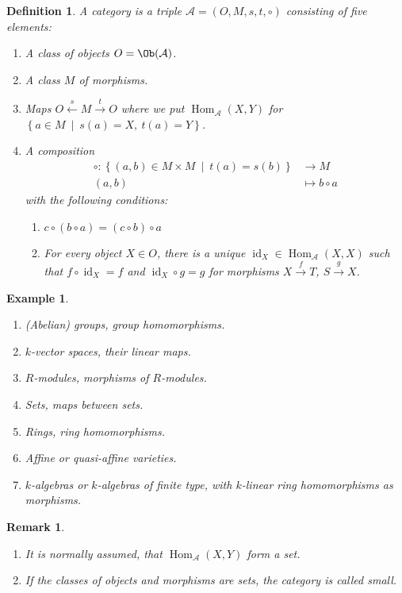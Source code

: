 \documentclass[DIV=14,parskip=full,pointednumbers]{scrartcl}
\newenvironment{alphanumerate}{\begin{enumerate}[label={$(\alph*)$},ref=\curthm]}{\end{enumerate}}
\theoremstyle{cthm}
\theoremstyle{cvarthm}
\theoremstyle{cdef}
\newtheorem*{defi*}{Definition}
\newtheorem{example*}{Example}
\newtheorem*{rem*}{Remark}
\newcommand{\Aa}{\mathcal{A}}
\newcommand{\Hom}{\operatorname{Hom}}
\newcommand{\id}{\operatorname{id}}
\newcommand{\longto}{\longrightarrow}
\newcommand{\longot}{\longleftarrow}
\newcommand{\morphism}[1][]{\overset{#1}{\longto}}
\newcommand{\st}{\ \middle|\ }
\begin{document}
	\begin{defi*}
	 A \emph{category} is a triple $\Aa = (O,M,s,t,\circ)$ consisting of five elements:
	 \begin{enumerate}
	  \item A class of \emph{objects} $O=\Ob(\Aa)$.
	  \item A class $M$ of \emph{morphisms}.
	  \item Maps $O\overset{s}{\longot} M \morphism[t] O$ where we put $\Hom_\Aa(X,Y)$ for $\left\{a\in M\st s(a) = X, \ t(a) = Y\right\}$.
	  \item A \emph{composition}
	  \begin{align*}
	   \circ: \left\{(a,b)\in M\times M \st t(a) = s(b)\right\} &\longto M\\
	   (a,b) &\longmapsto b\circ a         
	        \end{align*}
	        with the following conditions:
	        \begin{alphanumerate}
	        	\item $c\circ(b\circ a) = (c\circ b) \circ a$
	        	\item For every object $X\in O$, there is a unique $\id_X\in \Hom_\Aa(X,X)$ such that $f\circ \id_X = f$ and $\id_X\circ g = g$ for morphisms $X\morphism[f] T$, $S\morphism[g] X$.
	        \end{alphanumerate}
	 \end{enumerate}
	\end{defi*}
	\begin{example*} %
	 \begin{alphanumerate}
	  \item (Abelian) groups, group homomorphisms.
	  \item $k$-vector spaces, their linear maps.
	  \item $R$-modules, morphisms of $R$-modules.
	  \item Sets, maps between sets.
	  \item Rings, ring homomorphisms.
	  \item Affine or quasi-affine varieties. 
	  \item $k$-algebras or $k$-algebras of finite type, with $k$-linear ring homomorphisms as morphisms.
	 \end{alphanumerate}

	\end{example*}
	\begin{rem*}
	 \begin{alphanumerate}
	  \item It is normally assumed, that $\Hom_\Aa(X,Y)$ form a set.
	  \item If the classes of objects and morphisms are sets, the category is called \emph{small}.
	 \end{alphanumerate}
	\end{rem*}
\end{document}
